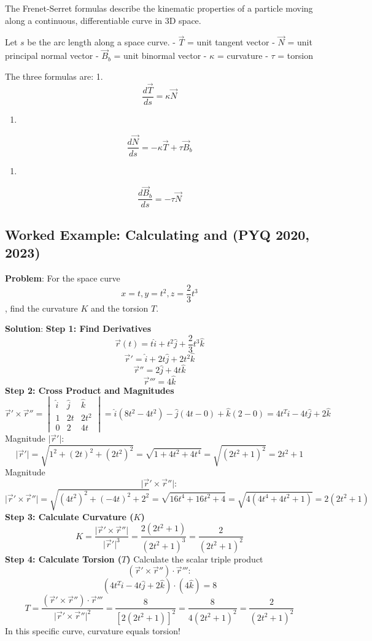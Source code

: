 \documentclass[
]{article}
\providecommand{\tightlist}{%
  \setlength{\itemsep}{0pt}\setlength{\parskip}{0pt}}
\begin{document}
The Frenet-Serret formulas describe the kinematic properties of a
particle moving along a continuous, differentiable curve in 3D space.

Let \(s\) be the arc length along a space curve. - \(\vec{T}\) = unit
tangent vector - \(\vec{N}\) = unit principal normal vector -
\(\vec{B}_b\) = unit binormal vector - \(\kappa\) = curvature - \(\tau\)
= torsion

The three formulas are: 1.
\[
\frac{d\vec{T}}{ds} = \kappa \vec{N}
\]
\begin{enumerate}
\def\labelenumi{\arabic{enumi}.}
\setcounter{enumi}{1}
\tightlist
\item
\end{enumerate}
\[
\frac{d\vec{N}}{ds} = -\kappa \vec{T} + \tau \vec{B}_b
\]
\begin{enumerate}
\def\labelenumi{\arabic{enumi}.}
\setcounter{enumi}{2}
\tightlist
\item
\end{enumerate}
\[
\frac{d\vec{B}_b}{ds} = -\tau \vec{N}
\]

\subsection{Worked Example: Calculating and (PYQ 2020,
2023)}\label{worked-example-calculating-and-pyq-2020-2023}

\textbf{Problem}: For the space curve
\[
x = t, y = t^2, z = \frac{2}{3}t^3
\]
, find the curvature \(K\) and the torsion \(T\).

\textbf{Solution}: \textbf{Step 1: Find Derivatives}
\[
\vec{r}(t) = t\hat{i} + t^2\hat{j} + \frac{2}{3}t^3\hat{k}
\]
\[
\vec{r}' = \hat{i} + 2t\hat{j} + 2t^2\hat{k}
\]
\[
\vec{r}'' = 2\hat{j} + 4t\hat{k}
\]
\[
\vec{r}''' = 4\hat{k}
\]
\textbf{Step 2: Cross Product and Magnitudes}
\[
\vec{r}' \times \vec{r}'' =
\begin{vmatrix}
\hat{i} & \hat{j} & \hat{k} \\
1 & 2t & 2t^2 \\
0 & 2 & 4t
\end{vmatrix} = \hat{i}(8t^2 - 4t^2) - \hat{j}(4t - 0) + \hat{k}(2 - 0) = 4t^2\hat{i} - 4t\hat{j} + 2\hat{k}
\]
Magnitude \(\lvert \vec{r}' \rvert\):
\[
\lvert \vec{r}' \rvert = \sqrt{1^2 + (2t)^2 + (2t^2)^2} = \sqrt{1 + 4t^2 + 4t^4} = \sqrt{(2t^2 + 1)^2} = 2t^2 + 1
\]
Magnitude
\[
\lvert \vec{r}' \times \vec{r}'' \rvert:
\]
\[
\lvert \vec{r}' \times \vec{r}'' \rvert = \sqrt{(4t^2)^2 + (-4t)^2 + 2^2} = \sqrt{16t^4 + 16t^2 + 4} = \sqrt{4(4t^4 + 4t^2 + 1)} = 2(2t^2 + 1)
\]
\textbf{Step 3: Calculate Curvature (\(K\))}
\[
K = \frac{\lvert \vec{r}' \times \vec{r}'' \rvert}{\lvert \vec{r}' \rvert^3} = \frac{2(2t^2 + 1)}{(2t^2 + 1)^3} = \frac{2}{(2t^2 + 1)^2}
\]
\textbf{Step 4: Calculate Torsion (\(T\))} Calculate the scalar triple
product
\[
(\vec{r}' \times \vec{r}'') \cdot \vec{r}''':
\]
\[
(4t^2\hat{i} - 4t\hat{j} + 2\hat{k}) \cdot (4\hat{k}) = 8
\]
\[
T = \frac{(\vec{r}' \times \vec{r}'') \cdot \vec{r}'''}{\lvert \vec{r}' \times \vec{r}'' \rvert^2} = \frac{8}{[2(2t^2 + 1)]^2} = \frac{8}{4(2t^2 + 1)^2} = \frac{2}{(2t^2 + 1)^2}
\]
In this specific curve, curvature equals torsion!
\end{document}
